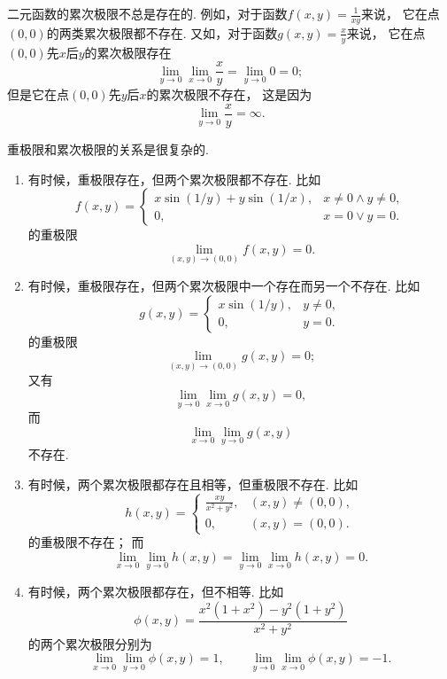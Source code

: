二元函数的累次极限不总是存在的.
例如，对于函数\(f(x,y)=\frac{1}{xy}\)来说，
它在点\((0,0)\)的两类累次极限都不存在.
又如，对于函数\(g(x,y)=\frac{x}{y}\)来说，
它在点\((0,0)\)先\(x\)后\(y\)的累次极限存在\[
	\lim_{y\to0}\lim_{x\to0}\frac{x}{y}
	=\lim_{y\to0}0
	=0;
\]
但是它在点\((0,0)\)先\(y\)后\(x\)的累次极限不存在，
这是因为\[
	\lim_{y\to0}\frac{x}{y}=\infty.
\]

\begin{example}
重极限和累次极限的关系是很复杂的.
\begin{enumerate}
	\item 有时候，重极限存在，但两个累次极限都不存在.
	比如\[
		f(x,y) = \left\{ \begin{array}{cl}
			x \sin(1/y) + y \sin(1/x), & x\neq0 \land y\neq0, \\
			0, & x=0 \lor y=0.
		\end{array} \right.
	\]的重极限\[
		\lim\limits_{(x,y)\to(0,0)} f(x,y) = 0.
	\]

	\item 有时候，重极限存在，但两个累次极限中一个存在而另一个不存在.
	比如\[
		g(x,y) = \left\{ \begin{array}{cl}
			x \sin(1/y), & y\neq0, \\
			0, & y=0.
		\end{array} \right.
	\]的重极限\[
		\lim\limits_{(x,y)\to(0,0)} g(x,y) = 0;
	\]
	又有\[
		\lim\limits_{y\to0} \lim\limits_{x\to0} g(x,y) = 0,
	\]
	而\[
		\lim\limits_{x\to0} \lim\limits_{y\to0} g(x,y)
	\]不存在.

	\item 有时候，两个累次极限都存在且相等，但重极限不存在.
	比如\[
		h(x,y) = \left\{ \begin{array}{cl}
			\frac{xy}{x^2+y^2}, & (x,y)\neq(0,0), \\
			0, & (x,y)=(0,0).
		\end{array} \right.
	\]的重极限不存在；
	而\[
		\lim\limits_{x\to0} \lim\limits_{y\to0} h(x,y)
		= \lim\limits_{y\to0} \lim\limits_{x\to0} h(x,y) = 0.
	\]

	\item 有时候，两个累次极限都存在，但不相等.
	比如\[
		\phi(x,y) = \frac{x^2(1+x^2) - y^2(1+y^2)}{x^2+y^2}
	\]的两个累次极限分别为\[
		\lim\limits_{x\to0} \lim\limits_{y\to0} \phi(x,y) = 1,
		\qquad
		\lim\limits_{y\to0} \lim\limits_{x\to0} \phi(x,y) = -1.
	\]
\end{enumerate}
\end{example}

